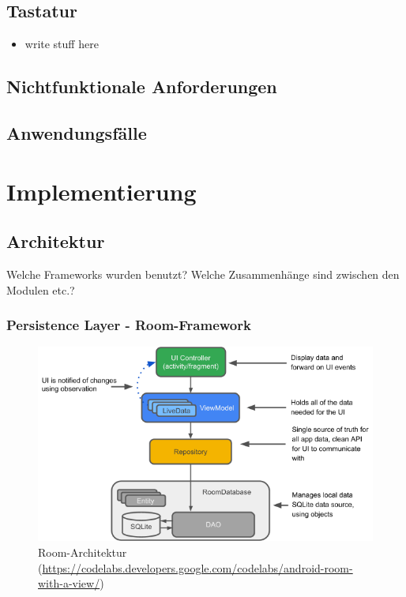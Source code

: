 \documentclass[11pt]{article}
\begin{document}
		\subsection{Tastatur}
		\begin{itemize}
			\item write stuff here
		\end{itemize}
	
	\subsection{Nichtfunktionale Anforderungen}
	\subsection{Anwendungsfälle}


\section{Implementierung}
	\subsection{Architektur}
		Welche Frameworks wurden benutzt? Welche Zusammenhänge sind zwischen den Modulen etc.?
		\subsubsection{Persistence Layer - Room-Framework}
		    \begin{figure}[H]
		        \centering
		        \includegraphics[width=1.0\textwidth]{Konzepte/roomArch.png}
		        \caption{Room-Architektur (\sloppy\url{https://codelabs.developers.google.com/codelabs/android-room-with-a-view/})}
		        \label{fig:room_arch}
		    \end{figure}
\end{document}
